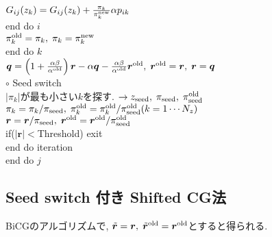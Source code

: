 \documentclass[12pt,titlepage]{jarticle}
\begin{document}
$G_{i j}(z_k) = G_{i j}(z_k) + \frac{\pi_k}{\pi_k^{\rm new}} \alpha p_{i k}$
\\\hspace{1.5cm}
end do $i$
\\\hspace{1.5cm}
$\pi_k^{\rm old} = \pi_k,\; \pi_k = \pi_k^{\rm new}$
\\\hspace{1.0cm}
end do $k$
\\\hspace{1.0cm}
${\boldsymbol q} = \left( 1 + \frac{\alpha \beta}{\alpha^{\rm old}} \right) {\boldsymbol r}
- \alpha {\boldsymbol q} - \frac{\alpha \beta}{\alpha^{\rm old}} {\boldsymbol r}^{\rm old},\; 
{\boldsymbol r}^{\rm old} = {\boldsymbol r},\; {\boldsymbol r} = {\boldsymbol q}$
\\\hspace{1.0cm}
$\circ$ Seed switch
\\\hspace{1.0cm}
$|\pi_k|$が最も小さい$k$を探す. $\rightarrow z_{\rm seed},\; \pi_{\rm seed},\; \pi_{\rm seed}^{\rm old} $
\\\hspace{1.0cm}
$\pi_k = \pi_k /\pi_{\rm seed},\; \pi_k^{\rm old} = \pi_k^{\rm old} / \pi_{\rm seed}^{\rm old} (k=1 \cdots N_z)$
\\\hspace{1.0cm}
${\boldsymbol r} = {\boldsymbol r} / \pi_{\rm seed},\; {\boldsymbol r}^{\rm old} = {\boldsymbol r}^{\rm old} / \pi_{\rm seed}^{\rm old}$
\\\hspace{1.0cm}
if($|{\boldsymbol r}| < $Threshold) exit
\\\hspace{0.5cm}
end do iteration
\\
end do $j$

\subsection{Seed switch 付き Shifted CG法}

BiCGのアルゴリズムで, ${\tilde {\boldsymbol r}} = {\boldsymbol r},\; 
{\tilde {\boldsymbol r}}^{\rm old} = {\boldsymbol r}^{\rm old}$とすると得られる.
\end{document}
